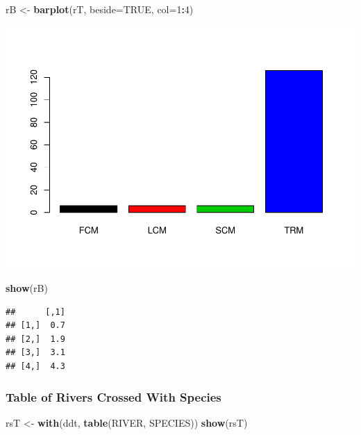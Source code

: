 \documentclass[]{article}
\newenvironment{Shaded}{\begin{snugshade}}{\end{snugshade}}
\newcommand{\KeywordTok}[1]{\textcolor[rgb]{0.13,0.29,0.53}{\textbf{#1}}}
\newcommand{\DataTypeTok}[1]{\textcolor[rgb]{0.13,0.29,0.53}{#1}}
\newcommand{\DecValTok}[1]{\textcolor[rgb]{0.00,0.00,0.81}{#1}}
\newcommand{\StringTok}[1]{\textcolor[rgb]{0.31,0.60,0.02}{#1}}
\newcommand{\OtherTok}[1]{\textcolor[rgb]{0.56,0.35,0.01}{#1}}
\newcommand{\OperatorTok}[1]{\textcolor[rgb]{0.81,0.36,0.00}{\textbf{#1}}}
\newcommand{\NormalTok}[1]{#1}
\begin{document}
\begin{Shaded}
\begin{Highlighting}[]
\NormalTok{rB <-}\StringTok{ }\KeywordTok{barplot}\NormalTok{(rT, }\DataTypeTok{beside=}\OtherTok{TRUE}\NormalTok{, }\DataTypeTok{col=}\DecValTok{1}\OperatorTok{:}\DecValTok{4}\NormalTok{)}
\end{Highlighting}
\end{Shaded}

\includegraphics{./tex2pdf.5760/8c7eaeb1b7142d9629207b3da5e11725f7b9a8cd.pdf}

\begin{Shaded}
\begin{Highlighting}[]
\KeywordTok{show}\NormalTok{(rB)}
\end{Highlighting}
\end{Shaded}

\begin{verbatim}
##      [,1]
## [1,]  0.7
## [2,]  1.9
## [3,]  3.1
## [4,]  4.3
\end{verbatim}

\subsubsection{Table of Rivers Crossed With
Species}\label{table-of-rivers-crossed-with-species}

\begin{Shaded}
\begin{Highlighting}[]
\NormalTok{rsT <-}\StringTok{ }\KeywordTok{with}\NormalTok{(ddt, }\KeywordTok{table}\NormalTok{(RIVER, SPECIES))}
\KeywordTok{show}\NormalTok{(rsT)}
\end{Highlighting}
\end{Shaded}
\end{document}
